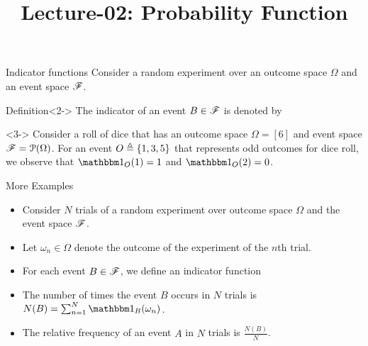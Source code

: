 \documentclass[12pt,aspectratio=169]{beamer}
\title{Lecture-02: Probability Function}
\date{}
\begin{document}
\pagestyle{empty}
\maketitle

\begin{frame}{Indicator functions}
Consider a random experiment over an outcome space $\Omega$ and an event space $\mathscr{F}$. 
    \begin{block}{Definition}<2->
    The indicator of an event $B \in \mathscr{F}$ is denoted by 
    \end{block}
    \begin{Example}<3->
    Consider a roll of dice that has an outcome space $\Omega = [6]$ and event space $\mathscr{F} = \mathcal{P}(\Omega)$. 
    For an event $O \triangleq \left\{1,3,5\right\}$ that represents odd outcomes for dice roll, we observe that $\Ind{O}(1) = 1$ and $\Ind{O}(2) = 0$. 
    \end{Example}
\end{frame}

\begin{frame}{More Examples}
    \begin{Example}
    \begin{itemize}
    \item <1-> Consider $N$ trials of a random experiment over outcome space $\Omega$ and the event space $\mathscr{F}$.  
    \item <2-> Let $\omega_n \in \Omega$ denote the outcome of the experiment of the $n$th trial. 
    \item <3-> For each event $B \in \mathscr{F}$, we define an indicator function 
    \item <4-> The number of times the event $B$ occurs in $N$ trials is $N(B) = \sum_{n=1}^N\Ind{B}(\omega_n)$. 
    \item <5-> The relative frequency of an event $A$ in $N$ trials is $\frac{N(B)}{N}$. 
    \end{itemize}
    \end{Example}
\end{frame}
\end{document}

